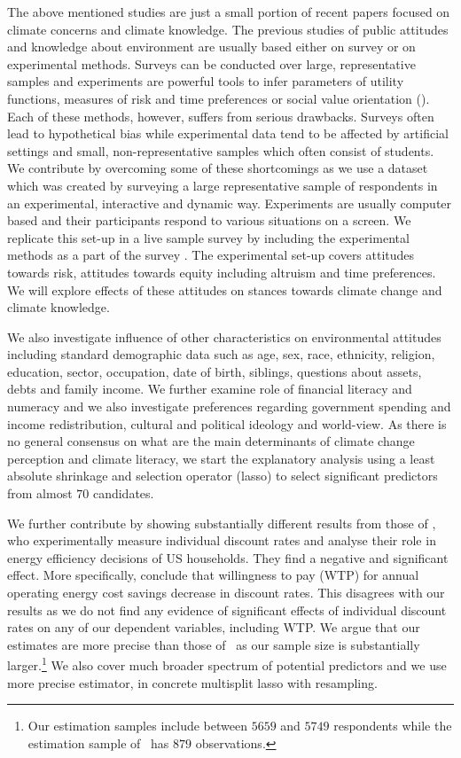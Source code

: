 \documentclass[a4paper,12pt]{article}
\begin{document}
The above mentioned studies are just a small portion of recent papers focused on climate concerns and climate knowledge. The previous studies of public attitudes and knowledge about environment are usually based either on survey or on experimental methods. Surveys can be conducted over large, representative samples and experiments are powerful tools to infer parameters of utility functions, measures of risk and time preferences or social value orientation (\citealp{ifcher2011, murphy2011SVO, tanaka2010riskTime}). Each of these methods, however, suffers from serious drawbacks. Surveys often lead to hypothetical bias while experimental data tend to be affected by artificial settings and small, non-representative samples which often consist of students. We contribute by overcoming some of these shortcomings as we use a dataset which was created by surveying a large representative sample of respondents in an experimental, interactive and dynamic way. Experiments are usually computer based and their participants respond to various situations on a screen. We replicate this set-up in a live sample survey by including the experimental methods as a part of the survey \citep{SurveyUK}. The experimental set-up covers attitudes towards risk, attitudes towards equity including altruism and time preferences. We will explore effects of these attitudes on stances towards climate change and climate knowledge.

We also investigate influence of other characteristics on environmental attitudes including standard demographic data such as age, sex, race, ethnicity, religion, education, sector, occupation, date of birth, siblings, questions about assets, debts and family income. We further examine role of financial literacy and numeracy and we also investigate preferences regarding government spending and income redistribution, cultural and political ideology and world-view. As there is no general consensus on what are the main determinants of climate change perception and climate literacy, we start the explanatory analysis using a least absolute shrinkage and selection operator (lasso) to select significant predictors from almost $70$ candidates. 

We further contribute by showing substantially different results from those of \citet{Newell2015}, who experimentally measure individual discount rates and analyse their role in energy efficiency decisions of US households. They find a negative and significant effect. More specifically, \citet{Newell2015} conclude that willingness to pay (WTP) for annual operating energy cost savings decrease in discount rates. This disagrees with our results as we do not find any evidence of significant effects of individual discount rates on any of our dependent variables, including WTP. We argue that our estimates are more precise than those of~\citet{Newell2015} as our sample size is substantially larger.\footnote{Our estimation samples include between $5659$ and $5749$ respondents while the estimation sample of~\citet{Newell2015} has $879$ observations.} We also cover much broader spectrum of potential predictors and we use more precise estimator, in concrete multisplit lasso with resampling. 
 
\end{document}
